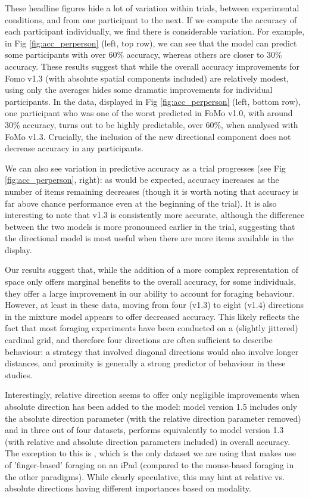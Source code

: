 \documentclass[man, floatsintext]{apa7}
\begin{document}
These headline figures hide a lot of variation within trials, between experimental conditions, and from one participant to the next. If we compute the accuracy of each participant individually, we find there is considerable variation. For example, in Fig \ref{fig:acc_perperson} (left, top row), we can see that the model can predict some participants with over 60\% accuracy, whereas others are closer to 30\% accuracy. These results suggest that while the overall accuracy improvements for Fomo v1.3 (with absolute spatial components included) are relatively modest, using only the averages hides some dramatic improvements for individual participants. In the \cite{hughes2024} data, displayed in Fig \ref{fig:acc_perperson} (left, bottom row), one participant who was one of the worst predicted in FoMo v1.0, with around 30\% accuracy, turns out to be highly predictable, over 60\%, when analysed with FoMo v1.3. Crucially, the inclusion of the new directional component does not decrease accuracy in any participants.

We can also see variation in predictive accuracy as a trial progresses (see Fig \ref{fig:acc_perperson}, right): as would be expected, accuracy increases as the number of items remaining decreases (though it is worth noting that accuracy is far above chance performance even at the beginning of the trial). It is also interesting to note that v1.3 is consistently more accurate, although the difference between the two models is more pronounced earlier in the trial, suggesting that the directional model is most useful when there are more items available in the display. 

Our results suggest that, while the addition of a more complex representation of space only offers marginal benefits to the overall accuracy, for some individuals, they offer a large improvement in our ability to account for foraging behaviour. However, at least in these data, moving from four (v1.3) to eight (v1.4) directions in the mixture model appears to offer decreased accuracy. This likely reflects the fact that most foraging experiments have been conducted on a (slightly jittered) cardinal grid, and therefore four directions are often sufficient to describe behaviour: a strategy that involved diagonal directions would also involve longer distances, and proximity is generally a strong predictor of behaviour in these studies. 

Interestingly, relative direction seems to offer only negligible improvements when absolute direction has been added to the model: model version 1.5 includes only the absolute direction parameter (with the relative direction parameter removed) and in three out of four datasets, performs equivalently to model version 1.3 (with relative and absolute direction parameters included) in overall accuracy. The exception to this is \cite{kristjansson2014}, which is the only dataset we are using that makes use of 'finger-based' foraging on an iPad (compared to the mouse-based foraging in the other paradigms). While clearly speculative, this may hint at relative vs. absolute directions having different importances based on modality.
\end{document}
